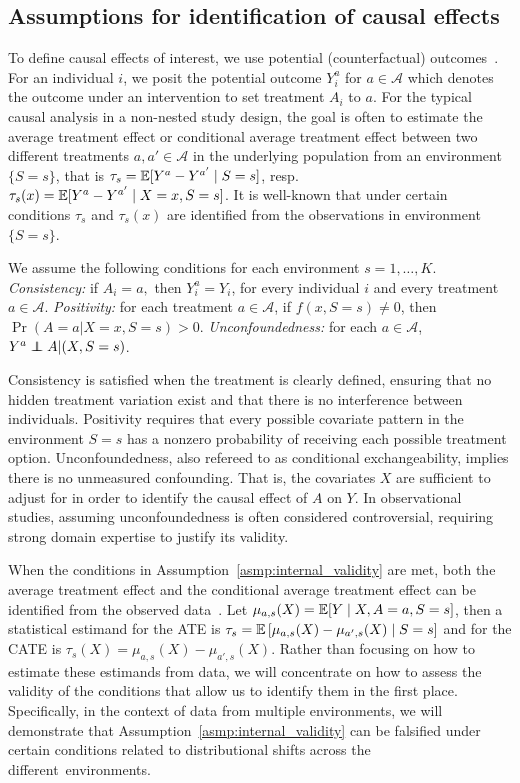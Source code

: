 \documentclass{article}
\begin{document}
\subsection{Assumptions for identification of causal effects}
To define causal effects of interest, we use potential (counterfactual) outcomes~\citep{rubin1974estimating}. For an individual $i$, we posit the potential outcome $Y_i^a$ for $a\in\mathcal{A}$ which
denotes the outcome under an intervention to set treatment $A_i$ to $a$. For the typical causal analysis in a non-nested study design, the goal is often to estimate the average treatment effect or conditional average treatment effect between two different treatments $a,a'\in\mathcal{A}$ in the underlying population from an environment $\{S=s\}$, that is $\tau_s=\mathbb{E}[Y^{a}-Y^{a'}\mid S=s]$, resp.  $\tau_s(x)=\mathbb{E}[Y^{a}-Y^{a'}\mid X=x, S=s]$.
It is well-known that under certain conditions $\tau_s$ and $\tau_s(x)$ are identified from the observations in environment $\{S=s\}$.
\begin{assumption}\label{asmp:internal_validity} We assume the following conditions for each environment $s=1,\dots,K$.
\textit{Consistency:} if $A_i = a,$ then $Y^a_i = Y_i$, for every individual $i$ and every treatment $a \in \mathcal A$.
\textit{Positivity:} for each treatment $a \in \mathcal A$, if $f(x, S=s) \neq 0$, then $\Pr(A = a | X = x, S = s) > 0$.
\textit{Unconfoundedness:} for each $a \in \mathcal A$, $Y^a \indep A | (X, S=s)$. 
\end{assumption}
Consistency is satisfied when the treatment is clearly defined, ensuring that no hidden treatment variation exist and that there is no interference between individuals.
Positivity requires that every possible covariate pattern in the environment ${S=s}$ has a nonzero probability of receiving each possible treatment option.
Unconfoundedness, also refereed to as conditional exchangeability, implies there is no unmeasured confounding. That is, the covariates $X$ are sufficient to adjust for in order to identify the causal effect of $A$ on $Y$. In observational studies, assuming unconfoundedness is often considered controversial, requiring strong domain expertise to justify its validity.

When the conditions in Assumption~\ref*{asmp:internal_validity} are met, both the average treatment effect and the conditional average treatment effect can be identified from the observed data~\citep{hernan2020causal}. Let $\mu_{a,s}(X)=\mathbb{E}[Y\mid X, A=a, S=s]$, then a statistical estimand for the ATE is $\tau_s=\mathbb{E}\left[\mu_{a,s}(X)-\mu_{a',s}(X) \mid S=s\right]$ and for the CATE is $\tau_s(X)=\mu_{a,s}(X)-\mu_{a',s}(X)$. Rather than focusing on how to estimate these estimands from data, we will concentrate on how to assess the validity of the conditions that allow us to identify them in the first place. Specifically, in the context of data from multiple environments, we will demonstrate that Assumption~\ref*{asmp:internal_validity} can be falsified under certain conditions related to distributional shifts across the different~environments.
\end{document}
